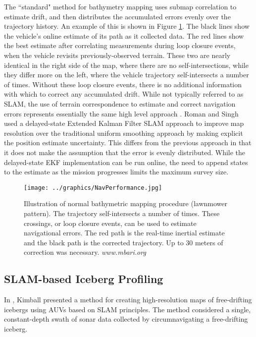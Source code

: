 The ``standard" method for bathymetry mapping uses submap correlation to estimate drift, and then distributes the accumulated errors evenly over the trajectory history. An example of this is shown in Figure \ref{fig:BathyMapping}. The black lines show the vehicle's online estimate of its path as it collected data. The red lines show the best estimate after correlating measurements during loop closure events, when the vehicle revisits previously-observed terrain. These two are nearly identical in the right side of the map, where there are no self-intersections, while they differ more on the left, where the vehicle trajectory self-intersects a number of times. Without these loop closure events, there is no additional information with which to correct any accumulated drift. While not typically referred to as SLAM, the use of terrain correspondence to estimate and correct navigation errors represents essentially the same high level approach \cite{Henthorn2006}.  Roman and Singh used a delayed-state Extended Kalman Filter SLAM approach to improve map resolution over the traditional uniform smoothing approach by making explicit the position estimate uncertainty\cite{Roman2005}. This differs from the previous approach in that it does not make the assumption that the error is evenly distributed. While the delayed-state EKF implementation can be run online, the need to append states to the estimate as the mission progresses limits the maximum survey size.

 \begin{figure}[!htb]
   \centering
   \texttt{[image: ../graphics/NavPerformance.jpg]} %
   \caption{Illustration of normal bathymetric mapping procedure (lawnmower pattern). The trajectory self-intersects a number of times. These crossings, or loop closure events, can be used to estimate navigational errors. The red path is the real-time inertial estimate and the black path is the corrected trajectory. Up to 30 meters of correction was necessary. \emph{www.mbari.org} }
   \label{fig:BathyMapping}
\end{figure}


\subsection{SLAM-based Iceberg Profiling}

In \cite{Kimball2011b}, Kimball presented a method for creating high-resolution maps of free-drifting icebergs using AUVs based on SLAM principles. The method considered a single, constant-depth swath of sonar data collected by circumnavigating a free-drifting iceberg. 

